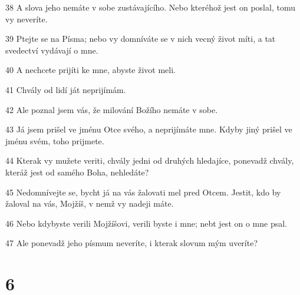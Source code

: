 \par 38 A slova jeho nemáte v sobe zustávajícího. Nebo kteréhož jest on poslal, tomu vy neveríte.
\par 39 Ptejte se na Písma; nebo vy domníváte se v nich vecný život míti, a tat svedectví vydávají o mne.
\par 40 A nechcete prijíti ke mne, abyste život meli.
\par 41 Chvály od lidí ját neprijímám.
\par 42 Ale poznal jsem vás, že milování Božího nemáte v sobe.
\par 43 Já jsem prišel ve jménu Otce svého, a neprijímáte mne. Kdyby jiný prišel ve jménu svém, toho prijmete.
\par 44 Kterak vy mužete veriti, chvály jedni od druhých hledajíce, ponevadž chvály, kteráž jest od samého Boha, nehledáte?
\par 45 Nedomnívejte se, bycht já na vás žalovati mel pred Otcem. Jestit, kdo by žaloval na vás, Mojžíš, v nemž vy nadeji máte.
\par 46 Nebo kdybyste verili Mojžíšovi, verili byste i mne; nebt jest on o mne psal.
\par 47 Ale ponevadž jeho písmum neveríte, i kterak slovum mým uveríte?

\chapter{6}

